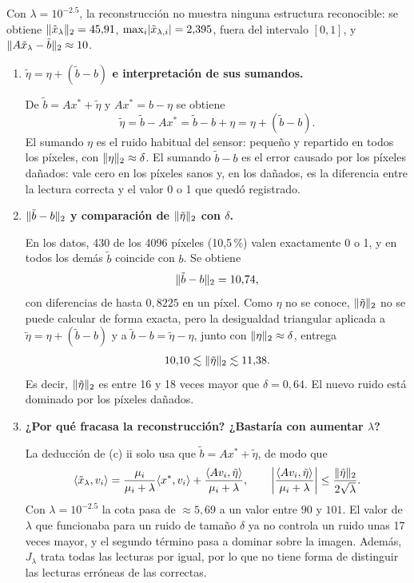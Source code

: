 \documentclass{article}
\begin{document}
Con $\lambda = 10^{-2.5}$, la reconstrucción no muestra ninguna estructura reconocible: se obtiene $\norm{\tilde{x}_\lambda}_2 = 45{,}91$, $\max_i \abs{\tilde{x}_{\lambda,i}} = 2{,}395$, fuera del intervalo $[0, 1]$, y $\norm{A\tilde{x}_\lambda - \tilde{b}}_2 \approx 10$.

\begin{enumerate}[label=\roman*., widest=iii]
  \item \textbf{$\tilde{\eta} = \eta + (\tilde{b} - b)$ e interpretación de sus sumandos.}

  De $\tilde{b} = Ax^* + \tilde{\eta}$ y $Ax^* = b - \eta$ se obtiene
  \[
    \tilde{\eta} = \tilde{b} - Ax^* = \tilde{b} - b + \eta = \eta + (\tilde{b} - b).
  \]
  El sumando $\eta$ es el ruido habitual del sensor: pequeño y repartido en todos los píxeles, con $\norm{\eta}_2 \approx \delta$. El sumando $\tilde{b} - b$ es el error causado por los píxeles dañados: vale cero en los píxeles sanos y, en los dañados, es la diferencia entre la lectura correcta y el valor 0 o 1 que quedó registrado.

  \item \textbf{$\norm{\tilde{b} - b}_2$ y comparación de $\norm{\tilde{\eta}}_2$ con $\delta$.}

  En los datos, 430 de los 4096 píxeles (10,5\,\%) valen exactamente 0 o 1, y en todos los demás $\tilde{b}$ coincide con $b$. Se obtiene
  \[
    \norm{\tilde{b} - b}_2 = 10{,}74,
  \]
  con diferencias de hasta $0{,}8225$ en un píxel. Como $\eta$ no se conoce, $\norm{\tilde{\eta}}_2$ no se puede calcular de forma exacta, pero la desigualdad triangular aplicada a $\tilde{\eta} = \eta + (\tilde{b} - b)$ y a $\tilde{b} - b = \tilde{\eta} - \eta$, junto con $\norm{\eta}_2 \approx \delta$, entrega
  \[
    10{,}10 \lesssim \norm{\tilde{\eta}}_2 \lesssim 11{,}38.
  \]
  Es decir, $\norm{\tilde{\eta}}_2$ es entre 16 y 18 veces mayor que $\delta = 0{,}64$. El nuevo ruido está dominado por los píxeles dañados.

  \item \textbf{¿Por qué fracasa la reconstrucción? ¿Bastaría con aumentar $\lambda$?}

  La deducción de (c) ii solo usa que $\tilde{b} = Ax^* + \tilde{\eta}$, de modo que
  \[
    \ip{\tilde{x}_\lambda}{v_i} = \frac{\mu_i}{\mu_i + \lambda}\ip{x^*}{v_i} + \frac{\ip{Av_i}{\tilde{\eta}}}{\mu_i + \lambda}, \qquad \abs*{\frac{\ip{Av_i}{\tilde{\eta}}}{\mu_i + \lambda}} \leq \frac{\norm{\tilde{\eta}}_2}{2\sqrt{\lambda}}.
  \]
  Con $\lambda = 10^{-2.5}$ la cota pasa de $\approx 5{,}69$ a un valor entre $90$ y $101$. El valor de $\lambda$ que funcionaba para un ruido de tamaño $\delta$ ya no controla un ruido unas 17 veces mayor, y el segundo término pasa a dominar sobre la imagen. Además, $J_\lambda$ trata todas las lecturas por igual, por lo que no tiene forma de distinguir las lecturas erróneas de las correctas.


\end{enumerate}
\end{document}
